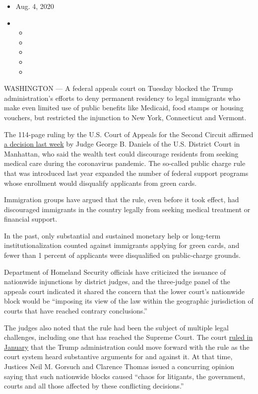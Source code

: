 \begin{itemize}
\item
  Aug. 4, 2020
\item
  \begin{itemize}
  \item
  \item
  \item
  \item
  \item
  \end{itemize}
\end{itemize}

WASHINGTON --- A federal appeals court on Tuesday blocked the Trump
administration's efforts to deny permanent residency to legal immigrants
who make even limited use of public benefits like Medicaid, food stamps
or housing vouchers, but restricted the injunction to New York,
Connecticut and Vermont.

The 114-page ruling by the U.S. Court of Appeals for the Second Circuit
affirmed
\href{https://www.nytimes.com/2020/07/30/us/trump-green-card.html}{a
decision last week} by Judge George B. Daniels of the U.S. District
Court in Manhattan, who said the wealth test could discourage residents
from seeking medical care during the coronavirus pandemic. The so-called
public charge rule that was introduced last year expanded the number of
federal support programs whose enrollment would disqualify applicants
from green cards.

Immigration groups have argued that the rule, even before it took
effect, had discouraged immigrants in the country legally from seeking
medical treatment or financial support.

In the past, only substantial and sustained monetary help or long-term
institutionalization counted against immigrants applying for green
cards, and fewer than 1 percent of applicants were disqualified on
public-charge grounds.

Department of Homeland Security officials have criticized the issuance
of nationwide injunctions by district judges, and the three-judge panel
of the appeals court indicated it shared the concern that the lower
court's nationwide block would be ``imposing its view of the law within
the geographic jurisdiction of courts that have reached contrary
conclusions.''

The judges also noted that the rule had been the subject of multiple
legal challenges, including one that has reached the Supreme Court. The
court
\href{https://www.nytimes.com/2020/01/27/us/supreme-court-trump-green-cards.html}{ruled
in January} that the Trump administration could move forward with the
rule as the court system heard substantive arguments for and against it.
At that time, Justices Neil M. Gorsuch and Clarence Thomas issued a
concurring opinion saying that such nationwide blocks caused ``chaos for
litigants, the government, courts and all those affected by these
conflicting decisions.''

